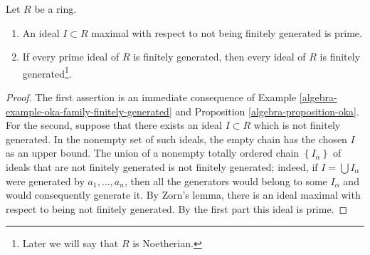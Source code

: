 \begin{lemma}
\label{editorial-source-lemma-cohen}
Let $R$ be a ring.
\begin{enumerate}
\item An ideal $I \subset R$ maximal with respect to not being
finitely generated is prime.
\item If every prime ideal of $R$ is
finitely generated, then
every ideal of $R$ is finitely generated\footnote{Later we will say
that $R$ is Noetherian.}.
\end{enumerate}
\end{lemma}

\begin{proof}
The first assertion is an immediate consequence of
Example \ref{algebra-example-oka-family-finitely-generated} and
Proposition \ref{algebra-proposition-oka}. For the second,
suppose that there exists an ideal $I \subset R$ which is not finitely
generated. In the nonempty set of such ideals, the empty chain
has the chosen $I$ as an upper bound. The union of a nonempty totally ordered chain $\left\{I_\alpha\right\}$
of ideals that are not finitely generated is not finitely generated;
indeed, if $I = \bigcup I_\alpha$ were generated by
$a_1, \ldots, a_n$, then all the generators would belong to some
$I_\alpha $ and would consequently generate it.
By Zorn's lemma, there is an ideal maximal with respect to being not finitely
generated. By the first part this ideal is prime.
\end{proof}